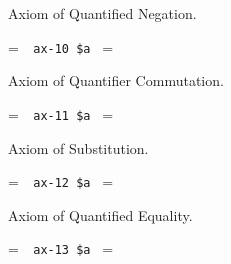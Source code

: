 \noindent Axiom of Quantified Negation.

\setbox\startprefix=\hbox{\tt \ \ ax-10\ \$a\ }
\setbox\contprefix=\hbox{\tt \ \ \ \ \ \ \ \ \ \ }
\startm
\m{\vdash}\m{(}\m{\lnot}\m{\forall}\m{\lnot}\m{\forall}\m{\varphi}\m{
\rightarrow}\m{\varphi}\m{)}
\endm

\noindent Axiom of Quantifier Commutation.

\setbox\startprefix=\hbox{\tt \ \ ax-11\ \$a\ }
\setbox\contprefix=\hbox{\tt \ \ \ \ \ \ \ \ \ \ }
\startm
\m{\vdash}\m{(}\m{\forall}\m{\forall}\m{\varphi}\m{\rightarrow}\m{
\forall}\m{\forall}\m{\varphi}\m{)}
\endm

\noindent Axiom of Substitution.

\setbox\startprefix=\hbox{\tt \ \ ax-12\ \$a\ }
\setbox\contprefix=\hbox{\tt \ \ \ \ \ \ \ \ \ \ \ }
\startm
\m{\vdash}\m{(}\m{\lnot}\m{\forall}\m{=}\m{\rightarrow}\m{(}
\m{=}\m{\rightarrow}\m{(}\m{\varphi}\m{\rightarrow}\m{\forall}\m{(}
\m{=}\m{\rightarrow}\m{\varphi}\m{)}\m{)}\m{)}\m{)}
\endm

\noindent Axiom of Quantified Equality.

\setbox\startprefix=\hbox{\tt \ \ ax-13\ \$a\ }
\setbox\contprefix=\hbox{\tt \ \ \ \ \ \ \ \ \ \ \ }
\startm
\m{\vdash}\m{(}\m{\lnot}\m{\forall}\m{=}\m{\rightarrow}\m{(}
\m{\lnot}\m{\forall}\m{=}\m{\rightarrow}\m{(}\m{=}
\m{\rightarrow}\m{\forall}\m{=}\m{)}\m{)}\m{)}
\endm

%
%
%
%

